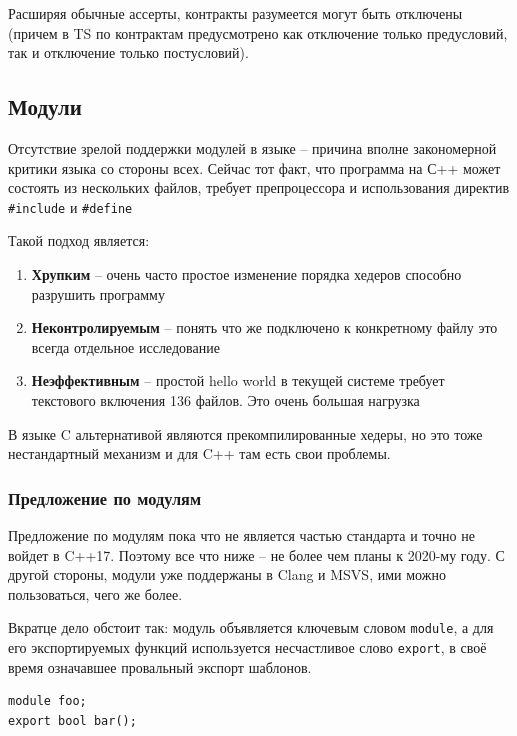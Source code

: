 \documentclass[a4paper,12pt,oneside]{article}
\begin{document}
Расширяя обычные ассерты, контракты разумеется могут быть отключены (причем в TS по контрактам предусмотрено как отключение только предусловий, так и отключение только постусловий).


\pagebreak
\subsection{Модули}\label{NewModules}

Отсутствие зрелой поддержки модулей в языке -- причина вполне закономерной критики языка со стороны всех. Сейчас тот факт, что программа на С++ может состоять из нескольких файлов, требует препроцессора и использования директив \lstinline!#include! и \lstinline!#define!

Такой подход является:

\begin{enumerate}
\item \textbf{Хрупким} -- очень часто простое изменение порядка хедеров способно разрушить программу
\item \textbf{Неконтролируемым} -- понять что же подключено к конкретному файлу это всегда отдельное исследование
\item \textbf{Неэффективным} -- простой hello world в текущей системе требует текстового включения 136 файлов. Это очень большая нагрузка
\end{enumerate}

В языке C альтернативой являются прекомпилированные хедеры, но это тоже нестандартный механизм и для C++ там есть свои проблемы.

\subsubsection{Предложение по модулям}

Предложение по модулям пока что не является частью стандарта и точно не войдет в C++17. Поэтому все что ниже -- не более чем планы к 2020-му году. С другой стороны, модули уже поддержаны в Clang и MSVS, ими можно пользоваться, чего же более.

Вкратце дело обстоит так: модуль объявляется ключевым словом \lstinline!module!, а для его экспортируемых функций используется несчастливое слово \lstinline!export!, в своё время означавшее провальный экспорт шаблонов.

\begin{lstlisting}
module foo;
export bool bar(); 
\end{lstlisting}
\end{document}
